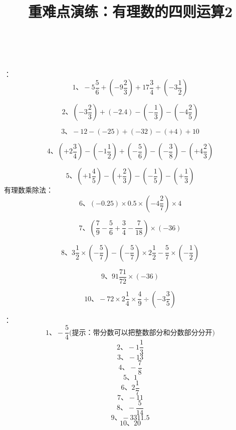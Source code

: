 \documentclass[fleqn]{article}
\title{重难点演练：有理数的四则运算2}
\begin{document}
  \hspace{4cm}{\Large 重难点演练：有理数的四则运算2}
  \\
  \\
  
  ：\\
  \[\text{1、} -5\frac56+(-9\frac23)+17\frac34+(-3\frac12)\]
  
  \[\text{2、} (-3\frac23)+(-2.4)-(-\frac13)-(-4\frac25)\]
  
  \[\text{3、} -12-(-25)+(-32)-(+4)+10\]
  
  \[\text{4、} (+2\frac34)-(-1\frac12)+(-\frac56)-(-\frac38)-(+4\frac23)\]
  
  \[\text{5、} (+1\frac45)-(+\frac23)-(-\frac15)-(+\frac13)\]
  有理数乘除法：
  \[\text{6、} (-0.25)\times0.5\times(-4\frac27)\times4\]
  
  \[\text{7、} (\frac79-\frac56+\frac34-\frac7{18})\times(-36)\]
  
  \[\text{8、} 3\frac12\times(-\frac57)-(-\frac57)\times2\frac12-\frac57\times(-\frac12)\]
  
  \[\text{9、} 91\frac{71}{72}\times(-36)\]
  
  \[\text{10、} -72\times2\frac14\times\frac49\div(-3\frac35)\]
    
    \newpage
    ：
    \[\text{1、} -\frac54\text{(提示：带分数可以把整数部分和分数部分分开)}\]
    \[\text{2、} -1\frac13\]
    \[\text{3、} -13\]
    \[\text{4、} -\frac78\]
    \[\text{5、} 1\]
    \[\text{6、} 2\frac17\]
    \[\text{7、} -11\]
    \[\text{8、} -\frac5{14}\]
    \[\text{9、} -3311.5\]
    \[\text{10、} 20\]
\end{document}
